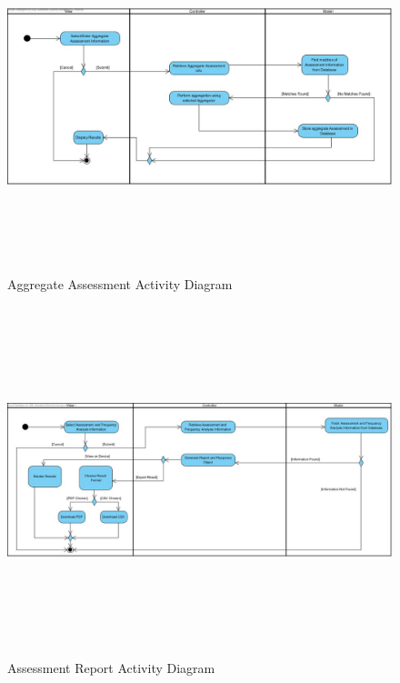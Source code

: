 \documentclass[12pt]{article}
\begin{document}
						\FloatBarrier
						\begin{figure}[h]
										\centering
										\includegraphics[width=6in, height=4in]{Pictures/AggregateAssesmentActivityDiagram.jpg}
										\caption{Aggregate Assessment Activity Diagram}
						\end{figure}
						\FloatBarrier
						\begin{figure}[h]
										\centering
										\includegraphics[width=6in, height=4in]{Pictures/AssessmentReportActivityDiagram.jpg}
										\caption{Assessment Report Activity Diagram}
						\end{figure}
						\FloatBarrier
\end{document}
